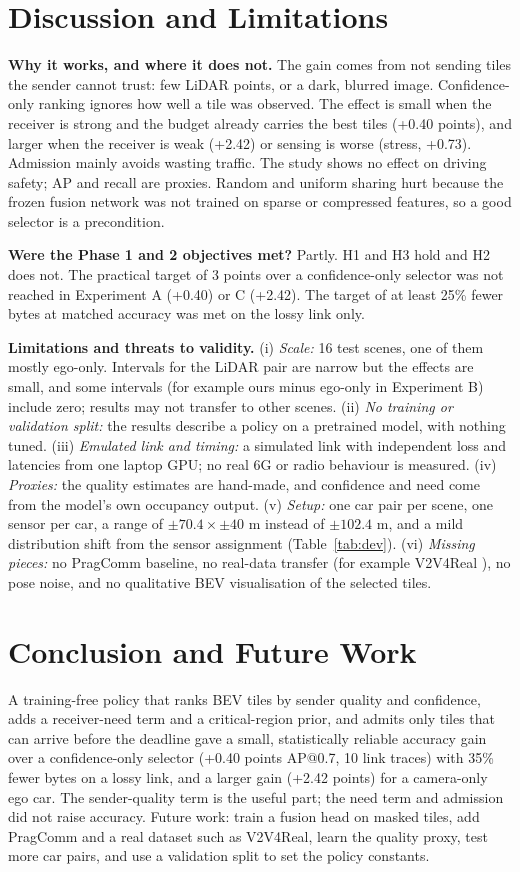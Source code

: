 \documentclass[conference]{IEEEtran}
\begin{document}
\section{Discussion and Limitations}\label{sec:discussion}
\textbf{Why it works, and where it does not.} The gain comes from not sending tiles the sender cannot trust: few LiDAR points, or a dark, blurred image. Confidence-only ranking ignores how well a tile was observed. The effect is small when the receiver is strong and the budget already carries the best tiles (+0.40 points), and larger when the receiver is weak (+2.42) or sensing is worse (stress, +0.73). Admission mainly avoids wasting traffic. The study shows no effect on driving safety; AP and recall are proxies. Random and uniform sharing hurt because the frozen fusion network was not trained on sparse or compressed features, so a good selector is a precondition.

\textbf{Were the Phase 1 and 2 objectives met?} Partly. H1 and H3 hold and H2 does not. The practical target of 3 points over a confidence-only selector was not reached in Experiment A (+0.40) or C (+2.42). The target of at least 25\% fewer bytes at matched accuracy was met on the lossy link only.

\textbf{Limitations and threats to validity.} (i) \emph{Scale:} 16 test scenes, one of them mostly ego-only. Intervals for the LiDAR pair are narrow but the effects are small, and some intervals (for example ours minus ego-only in Experiment B) include zero; results may not transfer to other scenes. (ii) \emph{No training or validation split:} the results describe a policy on a pretrained model, with nothing tuned. (iii) \emph{Emulated link and timing:} a simulated link with independent loss and latencies from one laptop GPU; no real 6G or radio behaviour is measured. (iv) \emph{Proxies:} the quality estimates are hand-made, and confidence and need come from the model's own occupancy output. (v) \emph{Setup:} one car pair per scene, one sensor per car, a range of $\pm70.4\times\pm40$ m instead of $\pm102.4$ m, and a mild distribution shift from the sensor assignment (Table~\ref{tab:dev}). (vi) \emph{Missing pieces:} no PragComm baseline, no real-data transfer (for example V2V4Real \cite{xu2023v2v4real}), no pose noise, and no qualitative BEV visualisation of the selected tiles.

\section{Conclusion and Future Work}\label{sec:conclusion}
A training-free policy that ranks BEV tiles by sender quality and confidence, adds a receiver-need term and a critical-region prior, and admits only tiles that can arrive before the deadline gave a small, statistically reliable accuracy gain over a confidence-only selector (+0.40 points AP@0.7, 10 link traces) with 35\% fewer bytes on a lossy link, and a larger gain (+2.42 points) for a camera-only ego car. The sender-quality term is the useful part; the need term and admission did not raise accuracy. Future work: train a fusion head on masked tiles, add PragComm and a real dataset such as V2V4Real, learn the quality proxy, test more car pairs, and use a validation split to set the policy constants.
\end{document}
